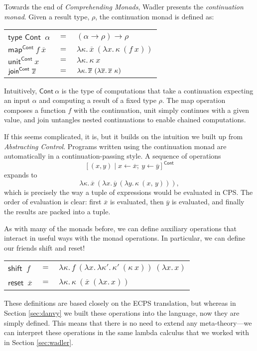 \documentclass[acmsmall, nonacm, screen]{acmart}
\newcommand\doverline[1]{%
  \setbox0=\hbox{$\overline{#1}$}%
  \ht0=\dimexpr\ht0-.30ex\relax%
  \overline{\copy0}%
}
\newcommand{\lambdaE}[2]{\lambda #1.\, #2}
\newcommand{\map}[3]{\textsf{map}^{\textsf{#1}}~#2~#3}
\newcommand{\unit}[2]{\textsf{unit}^{\textsf{#1}}~#2}
\newcommand{\join}[2]{\textsf{join}^{\textsf{#1}}~#2}
\begin{document}
Towards the end of {\em Comprehending Monads}, Wadler presents the {\em continuation monad}.
Given a result type, $\rho$, the continuation monad is defined as:
\begin{center}
  \begin{tabular}{lll}
    $\textsf{type Cont}$~$\alpha$ & $=$ & $(\alpha \to \rho) \to \rho$ \\
    $\map{Cont}{f}{\overline{x}}$ & $=$ & $\lambdaE{\kappa}{\overline{x}~(\lambdaE{x}{\kappa~(f~x)})}$ \\
    $\unit{Cont}{x}$ & $=$ & $\lambdaE{\kappa}{\kappa~x}$ \\
    $\join{Cont}{\doverline{x}}$ & $=$ &
      $\lambdaE{\kappa}{\doverline{x}~(\lambdaE{\overline{x}}{\overline{x}~\kappa})}$
  \end{tabular}
\end{center}
Intuitively, $\textsf{Cont}~\alpha$ is the type of computations that take a continuation
expecting an input $\alpha$ and computing a result of a fixed type $\rho$. The \textsf{map}
operation composes a function $f$ with the continuation, \textsf{unit} simply continues with a
given value, and \textsf{join} untangles nested continuations to enable chained computations.

If this seems complicated, it is, but it builds on the intuition we built up from {\em
Abstracting Control}. Programs written using the continuation monad are automatically in a
continuation-passing style. A sequence of operations
\[ [(x, y) \mid x \leftarrow \overline{x};\ y \leftarrow \overline{y}]^{\textsf{Cont}} \]
expands to
\[ \lambdaE{\kappa}{\overline{x}~(\lambdaE{x}{\overline{y}~(\lambdaE{y}{\kappa~(x,\, y)})})}, \]
which is precisely the way a tuple of expressions would be evaluated in CPS. The order of
evaluation is clear: first $\overline{x}$ is evaluated, then $\overline{y}$ is evaluated, and
finally the results are packed into a tuple.

As with many of the monads before, we can define auxiliary operations that interact in useful
ways with the monad operations. In particular, we can define our friends \textsf{shift} and
\textsf{reset}!
\begin{center}
  \begin{tabular}{lll}
    $\textsf{shift}$~$f$ & $=$ & $\lambdaE{\kappa}{f~(\lambdaE{x}{\lambdaE{\kappa'}{\kappa'~(\kappa~x)}})~(\lambdaE{x}{x})}$ \\
    $\textsf{reset}$~$\overline{x}$ & $=$ & $\lambdaE{\kappa}{\kappa~(\overline{x}~(\lambdaE{x}{x}))}$
  \end{tabular}
\end{center}
These definitions are based closely on the ECPS translation, but whereas in Section
\ref{sec:danvy} we built these operations into the language, now they are simply defined. This
means that there is no need to extend any meta-theory---we can interpret these operations in the
same lambda calculus that we worked with in Section \ref{sec:wadler}.
\end{document}
